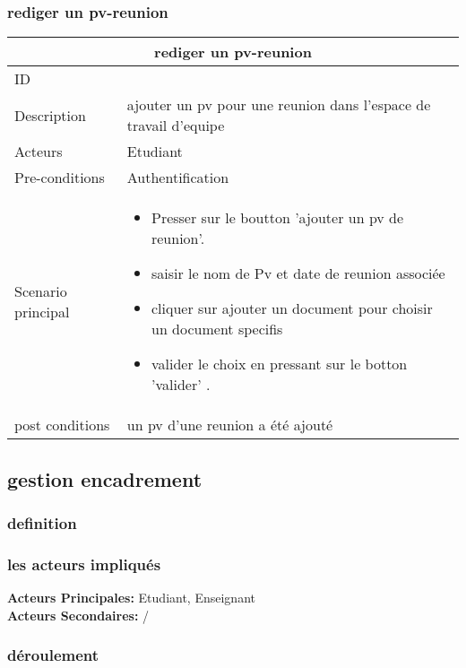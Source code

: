 \documentclass[11pt,fleqn]{book} %
\begin{document}
\subsubsection{rediger un pv-reunion}
\begin{center}
\begin{tabularx}{1\textwidth} { | p{4cm} | >{\raggedright\arraybackslash}X |  }
  \hline
  \multicolumn{2}{|c|}{rediger un pv-reunion} \\
 \hline
 ID & 6  \\
 \hline
 Description  &  ajouter un pv pour une reunion dans l'espace de travail d'equipe  \\
  \hline
 Acteurs  & Etudiant   \\
  \hline
 Pre-conditions  & Authentification\\
 \hline
 Scenario principal  &  
 \begin{itemize}
      \item Presser sur le boutton ’ajouter un pv de reunion’.
     \item saisir le nom de Pv et date de reunion associée 
     \item cliquer sur ajouter un document pour choisir un document specifis 
     \item valider le choix en pressant sur le botton ’valider’ .
 \end{itemize}\\
  \hline
 post conditions  & un pv d'une reunion a été ajouté  \\
  \hline
\end{tabularx}
\label{tbl:nicetablelesstable}
\end{center}

\subsection{gestion encadrement}

\subsubsection{definition}
\subsubsection{les acteurs impliqués}
\textbf{Acteurs Principales:} Etudiant, Enseignant\\
\textbf{Acteurs Secondaires:} /
\subsubsection{déroulement}
\end{document}
